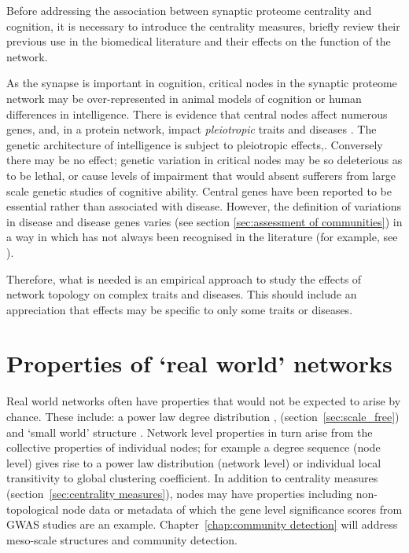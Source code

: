 Before addressing the association between synaptic proteome centrality and cognition, it is necessary to introduce the centrality measures, briefly review their previous use in the biomedical literature and their effects on the function of the network. 

As the synapse is important in cognition, critical nodes in the synaptic proteome network may be over-represented in animal models of cognition or human differences in intelligence. There is evidence that central nodes affect numerous genes, and, in a protein network, impact \textit{pleiotropic} traits and diseases \cite{chavali2010network}. The genetic architecture of intelligence is subject to pleiotropic effects\cite{plomin2015genetics},\cite{visscher2016plethora}.  Conversely there may be no effect; genetic variation in critical nodes may be so deleterious as to be lethal, or cause levels of impairment that would absent sufferers from large scale genetic studies of cognitive ability. Central genes have been reported to be essential rather than associated with disease\cite{barabasi2011network}. However, the definition of variations in disease and disease genes varies (see section \ref{sec:assessment of communities}) in a way in which has not always been recognised in the literature (for example, see \cite{goh2007human} ).

 Therefore, what is needed is an empirical approach to study the effects of network topology on complex traits and diseases. This should include an appreciation that effects may be specific to only some traits or diseases. 
 
 
 
 

 

 


\section{Properties of `real world' networks}
\label{sec:Properties of empirical networks}
Real world  networks often have properties that would not be expected to arise by chance. These include: a power law degree distribution \cite{barabasi1999emergence},\cite{barabasi1999mean} (section~\ref{sec:scale_free}) and `small world' structure \cite{watts1998collective}. Network level properties in turn arise from the collective properties of individual nodes; for example a degree sequence (node level) gives rise to a power law distribution (network level) or individual local transitivity to global clustering coefficient\cite{watts1998collective}. In addition to centrality measures (section~\ref{sec:centrality measures}), nodes may have properties including  non-topological node data\cite{wang2016approach} or metadata\cite{peel2017ground} of which the gene level significance scores from GWAS studies are an example. Chapter~\ref{chap:community detection} will address meso-scale structures and community detection. 

